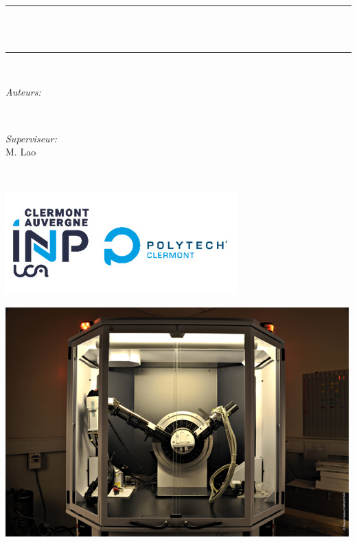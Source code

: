 
\begin{titlepage}
	\newcommand{\HRule}{\rule{\linewidth}{0.5mm}}
	\centering 
	\quad\\[1.5cm]


	\makeatletter
	\HRule \\[0.4cm]
	{ \huge \bfseries \@title}\\[0.4cm] 
	\HRule \\[1.5cm]
	\begin{minipage}{0.4\textwidth}
		\begin{flushleft} \large
			\emph{Auteurs:}\\
			\@author 
		\end{flushleft}
	\end{minipage}
	~
	\begin{minipage}{0.4\textwidth}
		\begin{flushright} \large
			\emph{Superviseur:} \\
			\textup{M. Lao }
		\end{flushright}
	\end{minipage}\\[1cm]
	\makeatother	
	
	\includegraphics[width=0.5\linewidth]{Premier_page/polytech_1}

	
	
	
	\vspace{2cm}
	
		\includegraphics[width=0.7\linewidth]{Premier_page/diffraction-dcmi}


	
	
	
	
	
	
	
	
	\vfill 
	
\end{titlepage}
		
